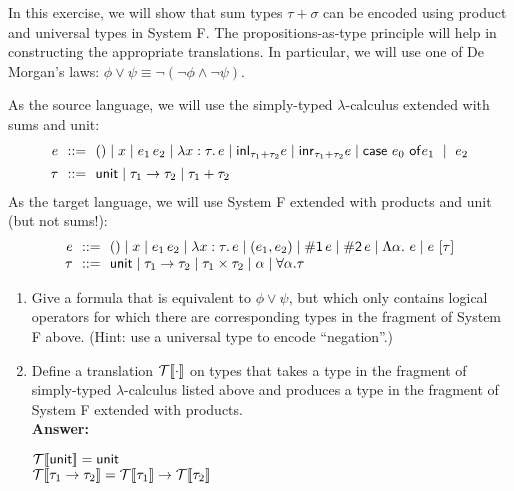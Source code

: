 \documentclass[10pt]{article}
\begin{document}
\begin{exercise} 

In this exercise, we will show that sum types $\tau + \sigma$
can be encoded using product and universal types in System F. The
propositions-as-type principle will help in constructing the
appropriate translations. In particular, we will use one of De
Morgan's laws: $\phi \vee \psi \equiv \neg (\neg \phi \wedge \neg \psi)$.

As the source language, we will use the simply-typed
$\lambda$-calculus extended with sums and unit:
%
\[
\begin{array}{r@{~~}c@{~~}l}
e    &::=& () \mid x \mid e_1\,e_2 \mid \lam{x:\tau}{e} \mid
           \lamfnt{inl}_{\tau_1+\tau_2} e \mid \lamfnt{inr}_{\tau_1+\tau_2} e \mid \lamfnt{case}~e_0~\lamfnt{of}e_1~\mid~{e_2}\\[1ex]
\tau &::=& \lamfnt{unit} \mid \tau_1 \arrow \tau_2 \mid \tau_1 + \tau_2\\
\end{array}
\]
%
As the target language, we will use System F extended with products
and unit (but not sums!):
%
\[
\begin{array}{r@{~~}c@{~~}l}
e    &::=& () \mid x \mid e_1\,e_2 \mid \lam{x:\tau}{e} \mid
           (e_1, e_2) \mid \lamfnt{\#1}\,e \mid \lamfnt{\#2}\,e \mid 
           \Lambda \alpha.~e \mid e~[\tau] \\
\tau &::=& \lamfnt{unit} \mid \tau_1 \arrow \tau_2 \mid \tau_1 \times \tau_2 \mid \alpha \mid \forall \alpha . \tau\\
\end{array}
\]

\begin{enumerate}
\item Give a formula that is equivalent to $\phi \vee \psi$, but which
  only contains logical operators for which there are corresponding
  types in the fragment of System F above.  (Hint: use a universal
  type to encode ``negation''.)

\item Define a translation ${\cal T}[\![\cdot]\!]$ on types that takes a type
  in the fragment of simply-typed $\lambda$-calculus listed above and
  produces a type in the fragment of System F extended with products.\\[0.1cm]
\noindent \textbf{Answer:}
\begin{center}
	${\cal T}[\![\mathsf{unit}]\!] = \mathsf{unit}$\\
	${\cal T}[\![\tau_1 \rightarrow \tau_2]\!] = {\cal T}[\![\tau_1]\!] \rightarrow {\cal T}[\![\tau_2]\!]$ 
\end{center}


\end{enumerate}
\end{exercise}
\end{document}
